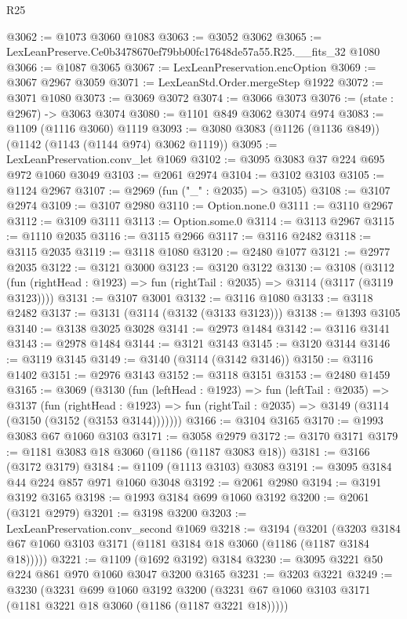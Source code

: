 \begin{lexlean}{R25}
\begin{coremodule}
@3062 := @1073 @3060 @1083
@3063 := @3052 @3062
@3065 := LexLeanPreserve.Ce0b3478670ef79bb00fc17648de57a55.R25.__fits_32 @1080
@3066 := @1087 @3065
@3067 := LexLeanPreservation.encOption
@3069 := @3067 @2967 @3059
@3071 := LexLeanStd.Order.mergeStep @1922
@3072 := @3071 @1080
@3073 := @3069 @3072
@3074 := @3066 @3073
@3076 := (state : @2967) -> @3063 @3074
@3080 := @1101 @849 @3062 @3074 @974
@3083 := @1109 (@1116 @3060) @1119
@3093 := @3080 @3083 (@1126 (@1136 @849)) (@1142 (@1143 (@1144 @974) @3062 @1119))
@3095 := LexLeanPreservation.conv_let @1069
@3102 := @3095 @3083 @37 @224 @695 @972 @1060 @3049
@3103 := @2061 @2974
@3104 := @3102 @3103
@3105 := @1124 @2967
@3107 := @2969 (fun ("_" : @2035) => @3105)
@3108 := @3107 @2974
@3109 := @3107 @2980
@3110 := Option.none.{0}
@3111 := @3110 @2967
@3112 := @3109 @3111
@3113 := Option.some.{0}
@3114 := @3113 @2967
@3115 := @1110 @2035
@3116 := @3115 @2966
@3117 := @3116 @2482
@3118 := @3115 @2035
@3119 := @3118 @1080
@3120 := @2480 @1077
@3121 := @2977 @2035
@3122 := @3121 @3000
@3123 := @3120 @3122
@3130 := @3108
    (@3112 (fun (rightHead : @1923) => fun (rightTail : @2035) => @3114 (@3117 (@3119 @3123))))
@3131 := @3107 @3001
@3132 := @3116 @1080
@3133 := @3118 @2482
@3137 := @3131 (@3114 (@3132 (@3133 @3123)))
@3138 := @1393 @3105
@3140 := @3138 @3025 @3028
@3141 := @2973 @1484
@3142 := @3116 @3141
@3143 := @2978 @1484
@3144 := @3121 @3143
@3145 := @3120 @3144
@3146 := @3119 @3145
@3149 := @3140 (@3114 (@3142 @3146))
@3150 := @3116 @1402
@3151 := @2976 @3143
@3152 := @3118 @3151
@3153 := @2480 @1459
@3165 := @3069
    (@3130
      (fun (leftHead : @1923) =>
      fun (leftTail : @2035) =>
      @3137
        (fun (rightHead : @1923) =>
        fun (rightTail : @2035) => @3149 (@3114 (@3150 (@3152 (@3153 @3144)))))))
@3166 := @3104 @3165
@3170 := @1993 @3083 @67 @1060 @3103
@3171 := @3058 @2979
@3172 := @3170 @3171
@3179 := @1181 @3083 @18 @3060 (@1186 (@1187 @3083 @18))
@3181 := @3166 (@3172 @3179)
@3184 := @1109 (@1113 @3103) @3083
@3191 := @3095 @3184 @44 @224 @857 @971 @1060 @3048
@3192 := @2061 @2980
@3194 := @3191 @3192 @3165
@3198 := @1993 @3184 @699 @1060 @3192
@3200 := @2061 (@3121 @2979)
@3201 := @3198 @3200
@3203 := LexLeanPreservation.conv_second @1069
@3218 := @3194
    (@3201 (@3203 @3184 @67 @1060 @3103 @3171 (@1181 @3184 @18 @3060 (@1186 (@1187 @3184 @18)))))
@3221 := @1109 (@1692 @3192) @3184
@3230 := @3095 @3221 @50 @224 @861 @970 @1060 @3047 @3200 @3165
@3231 := @3203 @3221
@3249 := @3230
    (@3231
      @699
      @1060
      @3192
      @3200
      (@3231 @67 @1060 @3103 @3171 (@1181 @3221 @18 @3060 (@1186 (@1187 @3221 @18)))))

\end{coremodule}
\end{lexlean}
